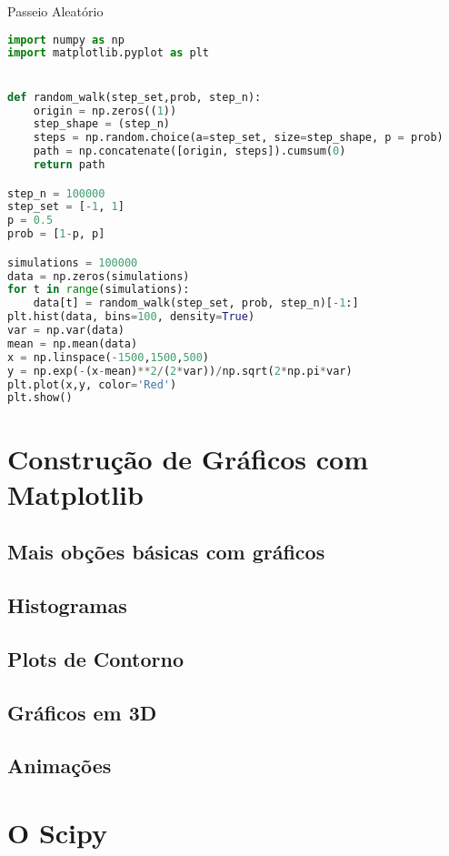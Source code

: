 \documentclass[12pt,a4paper,titlepage,portuges,twoside,final]{book}
\begin{document}
Passeio Aleatório

\begin{lstlisting}[language=Python, frame=lines,basicstyle=\footnotesize, caption={Histogram da Distribuição de Probabilidade da caminhada Aleatória}, label={lst:RW}]
import numpy as np
import matplotlib.pyplot as plt


def random_walk(step_set,prob, step_n):
    origin = np.zeros((1)) 
    step_shape = (step_n)
    steps = np.random.choice(a=step_set, size=step_shape, p = prob)
    path = np.concatenate([origin, steps]).cumsum(0)
    return path

step_n = 100000
step_set = [-1, 1]
p = 0.5
prob = [1-p, p]

simulations = 100000
data = np.zeros(simulations)
for t in range(simulations):
    data[t] = random_walk(step_set, prob, step_n)[-1:]
plt.hist(data, bins=100, density=True)
var = np.var(data)
mean = np.mean(data)
x = np.linspace(-1500,1500,500)
y = np.exp(-(x-mean)**2/(2*var))/np.sqrt(2*np.pi*var)
plt.plot(x,y, color='Red')
plt.show()    

\end{lstlisting}


\chapter{Construção de Gráficos com Matplotlib}
\section{Mais obções básicas com gráficos}
\section{Histogramas}
\section{Plots de Contorno}
\section{Gráficos em 3D}
\section{Animações}

\chapter{O Scipy}
\end{document}
